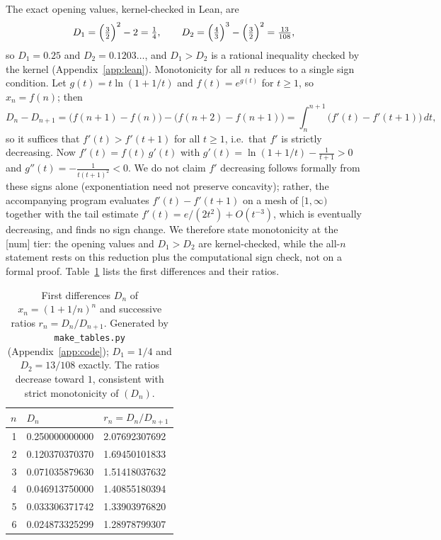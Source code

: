 \documentclass[11pt]{article}
\theoremstyle{plain}
\theoremstyle{remark}
\begin{document}
\noindent The exact opening values, kernel-checked in Lean, are
\[
  D_1 = \Bigl(\tfrac32\Bigr)^{2} - 2 = \tfrac14, \qquad
  D_2 = \Bigl(\tfrac43\Bigr)^{3} - \Bigl(\tfrac32\Bigr)^{2} = \tfrac{13}{108},
\]
so $D_1 = 0.25$ and $D_2 = 0.1203\ldots$, and $D_1 > D_2$ is a rational
inequality checked by the kernel (Appendix~\ref{app:lean}). Monotonicity for all
$n$ reduces to a single sign condition. Let $g(t) = t\ln(1+1/t)$ and
$f(t) = e^{g(t)}$ for $t \ge 1$, so $x_n = f(n)$; then
\[
  D_n - D_{n+1} = \bigl(f(n+1)-f(n)\bigr) - \bigl(f(n+2)-f(n+1)\bigr)
               = \int_n^{n+1}\!\bigl(f'(t) - f'(t+1)\bigr)\,dt ,
\]
so it suffices that $f'(t) > f'(t+1)$ for all $t \ge 1$, i.e.\ that $f'$ is
strictly decreasing. Now $f'(t) = f(t)\,g'(t)$ with
$g'(t) = \ln(1+1/t) - \tfrac1{t+1} > 0$ and
$g''(t) = -\tfrac1{t(t+1)^2} < 0$. We do not claim $f'$ decreasing follows
formally from these signs alone (exponentiation need not preserve concavity);
rather, the accompanying program evaluates $f'(t) - f'(t+1)$ on a mesh of
$[1,\infty)$ together with the tail estimate $f'(t) = e/(2t^2) + O(t^{-3})$,
which is eventually decreasing, and finds no sign change. We therefore state
monotonicity at the \textsf{[num]} tier: the opening values and $D_1 > D_2$ are
kernel-checked, while the all-$n$ statement rests on this reduction plus the
computational sign check, not on a formal proof. Table~\ref{tab:e} lists the
first differences and their ratios.

\begin{table}[ht]
\centering
\caption{First differences $D_n$ of $x_n = (1+1/n)^n$ and successive ratios
$r_n = D_n/D_{n+1}$. Generated by \texttt{make\_tables.py}
(Appendix~\ref{app:code}); $D_1 = 1/4$ and $D_2 = 13/108$ exactly. The ratios
decrease toward $1$, consistent with strict monotonicity of $(D_n)$.}
\label{tab:e}
\begin{tabular}{rll}
\toprule
$n$ & $D_n$ & $r_n = D_n/D_{n+1}$ \\
\midrule
1 & 0.250000000000 & 2.07692307692 \\
2 & 0.120370370370 & 1.69450101833 \\
3 & 0.071035879630 & 1.51418037632 \\
4 & 0.046913750000 & 1.40855180394 \\
5 & 0.033306371742 & 1.33903976820 \\
6 & 0.024873325299 & 1.28978799307 \\
\bottomrule
\end{tabular}
\end{table}
\end{document}

